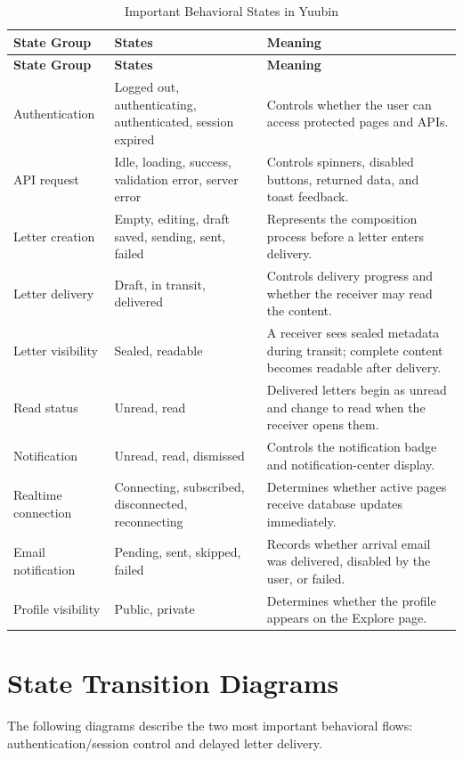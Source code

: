 ﻿\documentclass[12pt,a4paper]{report}
\begin{document}
\begin{longtable}{p{3.2cm} p{4cm} p{6.5cm}}
\caption{Important Behavioral States in Yuubin}
\label{tab:behavior_states}\\
\toprule
\textbf{State Group} & \textbf{States} & \textbf{Meaning} \\
\midrule
\endfirsthead
\toprule
\textbf{State Group} & \textbf{States} & \textbf{Meaning} \\
\midrule
\endhead
Authentication & Logged out, authenticating, authenticated, session expired & Controls whether the user can access protected pages and APIs. \\
API request & Idle, loading, success, validation error, server error & Controls spinners, disabled buttons, returned data, and toast feedback. \\
Letter creation & Empty, editing, draft saved, sending, sent, failed & Represents the composition process before a letter enters delivery. \\
Letter delivery & Draft, in transit, delivered & Controls delivery progress and whether the receiver may read the content. \\
Letter visibility & Sealed, readable & A receiver sees sealed metadata during transit; complete content becomes readable after delivery. \\
Read status & Unread, read & Delivered letters begin as unread and change to read when the receiver opens them. \\
Notification & Unread, read, dismissed & Controls the notification badge and notification-center display. \\
Realtime connection & Connecting, subscribed, disconnected, reconnecting & Determines whether active pages receive database updates immediately. \\
Email notification & Pending, sent, skipped, failed & Records whether arrival email was delivered, disabled by the user, or failed. \\
Profile visibility & Public, private & Determines whether the profile appears on the Explore page. \\
\bottomrule
\end{longtable}

\section{State Transition Diagrams}

The following diagrams describe the two most important behavioral flows: authentication/session control and delayed letter delivery.
\end{document}
